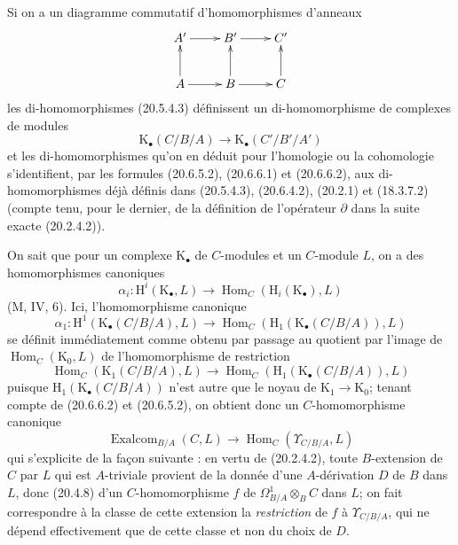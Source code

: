 Si on a un diagramme commutatif d'homomorphismes d'anneaux
\[
\xymatrix{
  A' \ar[r] & B' \ar[r] & C' \\
  A \ar[u] \ar[r] & B \ar[u] \ar[r] & C \ar[u]
}
\]
les di-homomorphismes (20.5.4.3) définissent un di-homomorphisme de
complexes de modules
\begin{equation}
\tag{20.6.6.4}
\label{0.20.6.6.4-fr}
  \mathrm{K}_\bullet(C/B/A)\longrightarrow
  \mathrm{K}_\bullet(C'/B'/A')
\end{equation}
et les di-homomorphismes qu'on en déduit pour l'homologie ou la
cohomologie s'identifient, par les formules (20.6.5.2), (20.6.6.1) et
(20.6.6.2), aux di-homomorphismes déjà définis dans (20.5.4.3),
(20.6.4.2), (20.2.1) et (18.3.7.2) (compte tenu, pour le dernier, de la
définition de l'opérateur $\partial$ dans la suite exacte (20.2.4.2)).

\begin{env}[20.6.7]
\label{0.20.6.7-fr}
On sait que pour un complexe $\mathrm{K}_\bullet$ de $C$-modules et un
$C$-module $L$, on a des homomorphismes canoniques
\[
  \alpha_i:\mathrm{H}^i(\mathrm{K}_\bullet,L)\longrightarrow
  \operatorname{Hom}_C(\mathrm{H}_i(\mathrm{K}_\bullet),L)
\]
(M, IV, 6). Ici, l'homomorphisme canonique
\[
  \alpha_1:\mathrm{H}^1(\mathrm{K}_\bullet(C/B/A),L)
  \longrightarrow
  \operatorname{Hom}_C(\mathrm{H}_1(\mathrm{K}_\bullet(C/B/A)),L)
\]
se définit immédiatement comme obtenu par passage au quotient par l'image
de $\operatorname{Hom}_C(\mathrm{K}_0,L)$ de l'homomorphisme de restriction
\[
  \operatorname{Hom}_C(\mathrm{K}_1(C/B/A),L)\longrightarrow
  \operatorname{Hom}_C(\mathrm{H}_1(\mathrm{K}_\bullet(C/B/A)),L)
\]
puisque $\mathrm{H}_1(\mathrm{K}_\bullet(C/B/A))$ n'est autre que le
noyau de $\mathrm{K}_1\to\mathrm{K}_0$; tenant compte de (20.6.6.2) et
(20.6.5.2), on obtient donc un $C$-homomorphisme canonique
\begin{equation}
\tag{20.6.7.1}
\label{0.20.6.7.1-fr}
  \operatorname{Exalcom}_{B/A}(C,L)\longrightarrow
  \operatorname{Hom}_C(\Upsilon_{C/B/A},L)
\end{equation}
qui s'explicite de la façon suivante : en vertu de (20.2.4.2), toute
$B$-extension de $C$ par $L$ qui est $A$-triviale provient de la donnée
d'une $A$-dérivation $D$ de $B$ dans $L$, donc (20.4.8) d'un
$C$-homomorphisme $f$ de $\Omega^1_{B/A}\otimes_B C$ dans $L$; on fait
correspondre à la classe de cette extension la \emph{restriction} de $f$
à $\Upsilon_{C/B/A}$, qui ne dépend effectivement que de cette classe et
non du choix de $D$.
\end{env}

